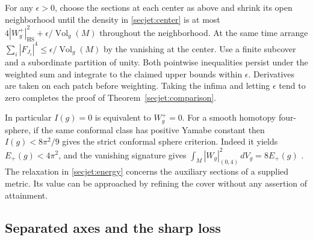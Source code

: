 \documentclass[11pt]{article}
\numberwithin{equation}{section}
\theoremstyle{definition}
\theoremstyle{remark}
\begin{document}
For any \(\epsilon>0\), choose the sections at each center as
above and shrink its open neighborhood until the density in
\eqref{secjet:center} is at most
\(4|W_g^+|_{\mathrm{HS}}^2+\epsilon/\operatorname{Vol}_g(M)\) throughout the
neighborhood. At the same time arrange
\(\sum_i|F_{J_i}|^4\le\epsilon/\operatorname{Vol}_g(M)\) by the
vanishing at the center. Use a finite subcover and a subordinate
partition of unity. Both pointwise inequalities persist under
the weighted sum and integrate to the claimed upper bounds within
\(\epsilon\). Derivatives are taken on each patch before weighting.
Taking the infima and letting \(\epsilon\) tend to zero completes
the proof of Theorem~\ref{secjet:comparison}.

In particular \(I(g)=0\) is equivalent to \(W_g^+=0\). For a smooth
homotopy four-sphere, if the same conformal class has positive Yamabe
constant then \(I(g)<8\pi^2/9\) gives the strict conformal sphere
criterion. Indeed it yields \(E_+(g)<4\pi^2\), and the vanishing
signature gives \(\int_M|W_g|_{(0,4)}^2\,dV_g=8E_+(g)\)
\cite{Hirzebruch1971Signature,ChangGurskyYang2003}. The relaxation in
\eqref{secjet:energy} concerns the auxiliary sections of a supplied
metric. Its value can be approached by refining the cover without
any assertion of attainment.

\subsection{Separated axes and the sharp loss}
\end{document}
